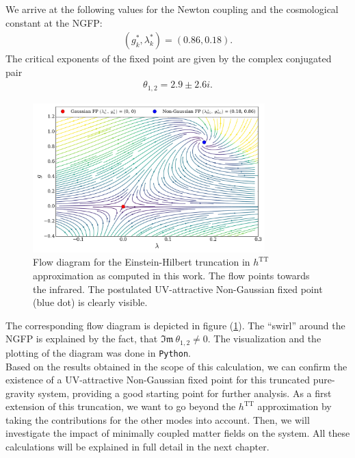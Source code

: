 We arrive at the following values for the Newton coupling and the cosmological constant at the NGFP:
\begin{align}
	(g_k^*, \lambda_k^*) = (0.86, 0.18).
\end{align}
The critical exponents of the fixed point are given by the complex conjugated pair
\begin{align}
	\theta_{1,2} = 2.9 \pm 2.6i. 
\end{align}
\begin{figure}[t]
\centering
	\includegraphics[width=0.8\textwidth]{figs/Plots/EH_NoMatter}
	\caption[Flow diagram for the Einstein-Hilbert truncation in $h^{\mathrm{TT}}$ approximation]{Flow diagram  for the Einstein-Hilbert truncation in $h^{\mathrm{TT}}$ approximation as computed in this work. The flow points towards the infrared. The postulated UV-attractive Non-Gaussian fixed point (blue dot) is clearly visible. }
	\label{fig:flow_diag}
\hrulefill	
\end{figure}
The corresponding flow diagram is depicted in figure  (\ref{fig:flow_diag}). The \enquote{swirl} around the NGFP is explained by the fact, that $\mathfrak{Im}\ \theta_{1,2} \neq 0$. The visualization and the plotting of the diagram was done in \verb|Python|.\\
Based on the results obtained in the scope of this calculation, we can confirm the existence of a UV-attractive Non-Gaussian fixed point for this truncated pure-gravity system, providing a good starting point for further analysis. As a first extension of this truncation, we want to go beyond the $h^{\mathrm{TT}}$ approximation by taking the contributions for the other modes into account. Then, we will investigate the impact of minimally coupled matter fields on the system. All these calculations will be explained in full detail in the next chapter. 
